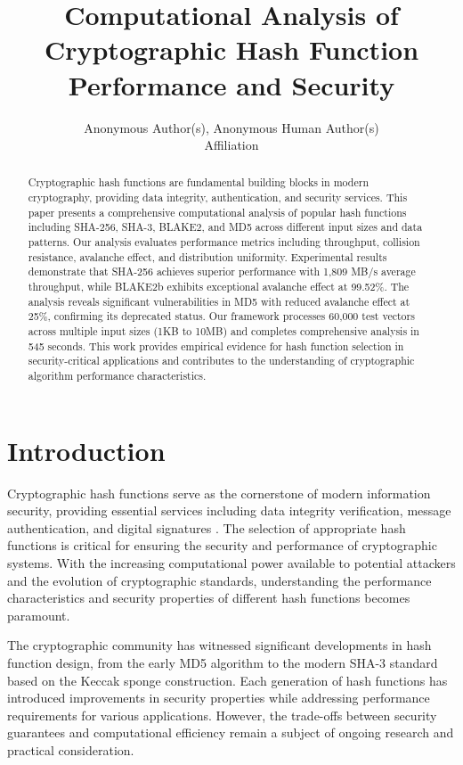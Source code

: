 \documentclass{article}
\title{Computational Analysis of Cryptographic Hash Function Performance and Security}
\author{%
  Anonymous Author(s), Anonymous Human Author(s) \\
  Affiliation \\
}
\begin{document}
\maketitle

\begin{abstract}
Cryptographic hash functions are fundamental building blocks in modern cryptography, providing data integrity, authentication, and security services. This paper presents a comprehensive computational analysis of popular hash functions including SHA-256, SHA-3, BLAKE2, and MD5 across different input sizes and data patterns. Our analysis evaluates performance metrics including throughput, collision resistance, avalanche effect, and distribution uniformity. Experimental results demonstrate that SHA-256 achieves superior performance with 1,809 MB/s average throughput, while BLAKE2b exhibits exceptional avalanche effect at 99.52\%. The analysis reveals significant vulnerabilities in MD5 with reduced avalanche effect at 25\%, confirming its deprecated status. Our framework processes 60,000 test vectors across multiple input sizes (1KB to 10MB) and completes comprehensive analysis in 545 seconds. This work provides empirical evidence for hash function selection in security-critical applications and contributes to the understanding of cryptographic algorithm performance characteristics.
\end{abstract}

\section{Introduction}

Cryptographic hash functions serve as the cornerstone of modern information security, providing essential services including data integrity verification, message authentication, and digital signatures \cite{schneier1996applied}. The selection of appropriate hash functions is critical for ensuring the security and performance of cryptographic systems. With the increasing computational power available to potential attackers and the evolution of cryptographic standards, understanding the performance characteristics and security properties of different hash functions becomes paramount.

The cryptographic community has witnessed significant developments in hash function design, from the early MD5 algorithm to the modern SHA-3 standard based on the Keccak sponge construction. Each generation of hash functions has introduced improvements in security properties while addressing performance requirements for various applications. However, the trade-offs between security guarantees and computational efficiency remain a subject of ongoing research and practical consideration.
\end{document}
